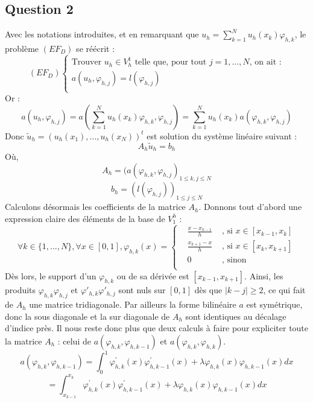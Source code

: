\documentclass[a4paper,12pt]{article}
\begin{document}
\subsection{Question 2}

Avec les notations introduites, et en remarquant que $u_h=\sum_{k=1}^{N} u_h(x_k) \varphi_{h,k}$, le probl\`eme $(EF_D)$ se r\'e\'ecrit :
\[(EF_D)\left\{\begin{array}{ccccc}
\text{Trouver } u_h \in V_{h}^{1} \text{ telle que, pour tout } j=1,...,N\text{, on ait :}\\
a(u_h,\varphi_{h,j})=l(\varphi_{h,j})\\
\end{array}
\right.
\]
Or :
\[a(u_h,\varphi_{h,j})=a\left(\sum_{k=1}^{N} u_h(x_k) \varphi_{h,k},\varphi_{h,j}\right)=\sum_{k=1}^{N} u_h(x_k) a(\varphi_{h,k},\varphi_{h,j})
\]
Donc $\tilde{u}_{h}=(u_h(x_1),...,u_h(x_N))^t$ est solution du syst\`eme lin\'eaire suivant :
\begin{equation}
  A_{h}\tilde{u}_{h}=b_{h}
	\label{eq_8}
\end{equation}
O\`u,
\[A_h=(a(\varphi_{h,k},\varphi_{h,j})_{1 \leq k,j \leq N}\]
\[b_h=(l(\varphi_{h,j}))_{1 \leq j \leq N}\]
Calculons d\'esormais les coefficients de la matrice $A_h$. Donnons tout d'abord une expression claire des \'el\'ements de la base de $V_{1}^{h}$ :
\[\forall k \in \{1,...,N\}, \forall x \in [0,1], \varphi_{h,k}(x)=\left\{\begin{array}{ccccc}
&\frac{x-x_{k-1}}{h}& \text{ , si } x \in [x_{k-1},x_k]\\
&\frac{x_{k+1}-x}{h}& \text{ , si } x \in [x_k,x_{k+1}]\\
&0& \text{ , sinon}\\
\end{array}
\right.
\]
D\`es lors, le support d'un $\varphi_{h,k}$ ou de sa d\'eriv\'ee est $[x_{k-1},x_{k+1}]$. Ainsi, les produits $\varphi_{h,k}\varphi_{h,j}$ et $\varphi'_{h,k}\varphi'_{h,j}$ sont nuls sur $[0,1]$ d\`es que $|k-j|\geq 2$, ce qui fait de $A_h$ une matrice tridiagonale. Par ailleurs la forme bilin\'eaire $a$ est sym\'etrique, donc la sous diagonale et la sur diagonale de $A_h$ sont identiques au d\'ecalage d'indice pr\`es. Il nous reste donc plus que deux calculs \`a faire pour expliciter toute la matrice $A_h$ : celui de $a(\varphi_{h,k},\varphi_{h,k-1})$ et $a(\varphi_{h,k},\varphi_{h,k})$.
\[a(\varphi_{h,k},\varphi_{h,k-1})=\int_{0}^{1} {\varphi_{h,k}^{'}(x)\varphi_{h,k-1}^{'}(x)+\lambda\varphi_{h,k}(x)\varphi_{h,k-1}(x) dx}\]
\[=\int_{x_{k-1}}^{x_k} {\varphi_{h,k}^{'}(x)\varphi_{h,k-1}^{'}(x)+\lambda\varphi_{h,k}(x)\varphi_{h,k-1}(x) dx}\]
\end{document}
